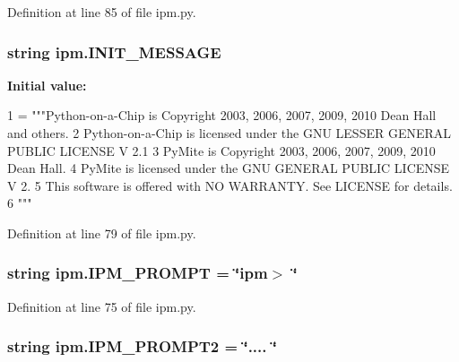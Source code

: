 Definition at line 85 of file ipm.\-py.

\hypertarget{namespaceipm_afe8d07b2f15a5f11fd06a390db464bb9}{
\subsubsection[{I\-N\-I\-T\-\_\-\-M\-E\-S\-S\-A\-G\-E}]{\setlength{\rightskip}{0pt plus 5cm}string ipm.\-I\-N\-I\-T\-\_\-\-M\-E\-S\-S\-A\-G\-E}}\label{namespaceipm_afe8d07b2f15a5f11fd06a390db464bb9}
{\bfseries Initial value\-:}
\begin{DoxyCode}
1 = \textcolor{stringliteral}{"""Python-on-a-Chip is Copyright 2003, 2006, 2007, 2009, 2010 Dean Hall and others.}
2 \textcolor{stringliteral}{Python-on-a-Chip is licensed under the GNU LESSER GENERAL PUBLIC LICENSE V 2.1}
3 \textcolor{stringliteral}{PyMite is Copyright 2003, 2006, 2007, 2009, 2010 Dean Hall.}
4 \textcolor{stringliteral}{PyMite is licensed under the GNU GENERAL PUBLIC LICENSE V 2.}
5 \textcolor{stringliteral}{This software is offered with NO WARRANTY.  See LICENSE for details.}
6 \textcolor{stringliteral}{"""}
\end{DoxyCode}


Definition at line 79 of file ipm.\-py.

\hypertarget{namespaceipm_ac984a69785638acce3c90bff9306bd4b}{
\subsubsection[{I\-P\-M\-\_\-\-P\-R\-O\-M\-P\-T}]{\setlength{\rightskip}{0pt plus 5cm}string ipm.\-I\-P\-M\-\_\-\-P\-R\-O\-M\-P\-T = \char`\"{}ipm$>$ \char`\"{}}}\label{namespaceipm_ac984a69785638acce3c90bff9306bd4b}


Definition at line 75 of file ipm.\-py.

\hypertarget{namespaceipm_a75c7a2f843f4effc11070c126cb836ab}{
\subsubsection[{I\-P\-M\-\_\-\-P\-R\-O\-M\-P\-T2}]{\setlength{\rightskip}{0pt plus 5cm}string ipm.\-I\-P\-M\-\_\-\-P\-R\-O\-M\-P\-T2 = \char`\"{}.... \char`\"{}}}\label{namespaceipm_a75c7a2f843f4effc11070c126cb836ab}


